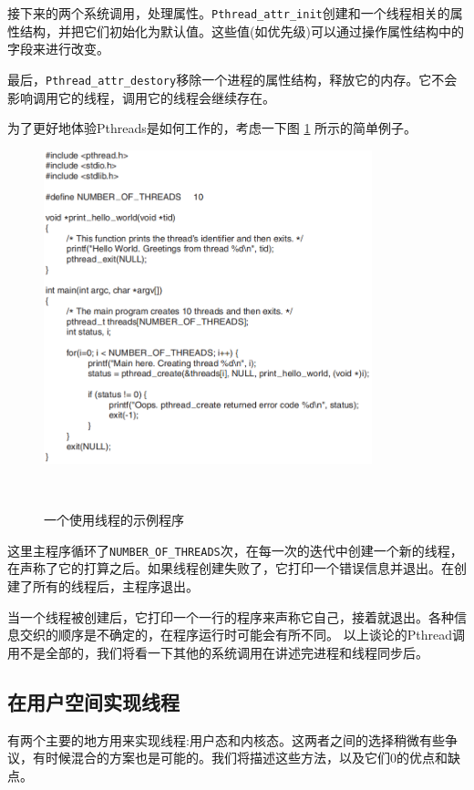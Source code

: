 	接下来的两个系统调用，处理属性。\texttt{Pthread\_attr\_init}创建和一个线程相关的属性结构，并把它们初始化为默认值。这些值(如优先级)可以通过操作属性结构中的字段来进行改变。
	
	最后，\texttt{Pthread\_attr\_destory}移除一个进程的属性结构，释放它的内存。它不会影响调用它的线程，调用它的线程会继续存在。
	
	为了更好地体验Pthreads是如何工作的，考虑一下图 \ref{fig:threadexample} 所示的简单例子。
	
	\begin{figure}[ht]\small
		\centering
		\includegraphics[width=0.85\textwidth]{FIG/2-15.png}
		\caption{一个使用线程的示例程序}　\label{fig:threadexample}
	\end{figure}
	
	这里主程序循环了\texttt{NUMBER\_OF\_THREADS}次，在每一次的迭代中创建一个新的线程，在声称了它的打算之后。如果线程创建失败了，它打印一个错误信息并退出。在创建了所有的线程后，主程序退出。
	
	当一个线程被创建后，它打印一个一行的程序来声称它自己，接着就退出。各种信息交织的顺序是不确定的，在程序运行时可能会有所不同。
	以上谈论的Pthread调用不是全部的，我们将看一下其他的系统调用在讲述完进程和线程同步后。
	
	\subsection{在用户空间实现线程}
	
	有两个主要的地方用来实现线程:用户态和内核态。这两者之间的选择稍微有些争议，有时候混合的方案也是可能的。我们将描述这些方法，以及它们0的优点和缺点。
	
